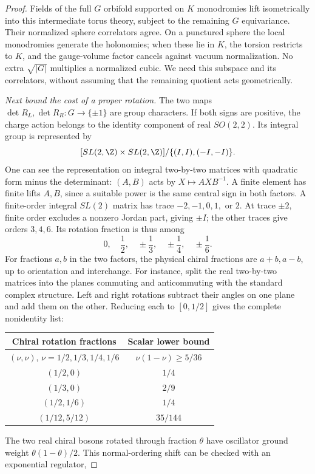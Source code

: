 \begin{proof}
Fields of the full $G$ orbifold supported on $K$ monodromies
lift isometrically into this intermediate torus theory, subject
to the remaining $G$ equivariance. Their normalized sphere
correlators agree. On a punctured sphere the local monodromies
generate the holonomies; when these lie in $K$, the torsion
restricts to $K$, and the gauge-volume factor cancels against
vacuum normalization. No extra $\sqrt{|G|}$ multiplies a
normalized cubic. We need this subspace and its correlators,
without assuming that the remaining quotient acts geometrically.

\emph{Next bound the cost of a proper rotation.}
The two maps $\det R_L,\det R_R:G\to\{\pm1\}$ are group
characters. If both signs are positive, the charge action belongs
to the identity component of real $SO(2,2)$. Its integral group
is represented by
\[
 [SL(2,\Z)\times SL(2,\Z)]/\{(I,I),(-I,-I)\}.
\]
One can see the representation on integral two-by-two matrices
with quadratic form minus the determinant: $(A,B)$ acts by
$X\mapsto AXB^{-1}$. A finite element has finite lifts $A,B$,
since a suitable power is the same central sign in both factors.
A finite-order integral $SL(2)$ matrix has trace
$-2,-1,0,1,$ or $2$. At trace $\pm2$, finite order excludes
a nonzero Jordan part, giving $\pm I$; the other traces give
orders $3,4,6$. Its rotation fraction is thus among
\[
 0,\quad\frac12,\quad\pm\frac13,\quad
 \pm\frac14,\quad\pm\frac16.
\]
For fractions $a,b$ in the two factors, the physical chiral
fractions are $a+b,a-b$, up to orientation and interchange.
For instance, split the real two-by-two matrices into the
planes commuting and anticommuting with the standard complex
structure. Left and right rotations subtract their angles on
one plane and add them on the other.
Reducing each to $[0,1/2]$ gives the complete nonidentity list:
\begin{center}
\begin{tabular}{c|c}
Chiral rotation fractions & Scalar lower bound\\\hline
$(\nu,\nu)$, $\nu=1/2,1/3,1/4,1/6$
 & $\nu(1-\nu)\geq5/36$\\
$(1/2,0)$ & $1/4$\\
$(1/3,0)$ & $2/9$\\
$(1/2,1/6)$ & $1/4$\\
$(1/12,5/12)$ & $35/144$
\end{tabular}
\end{center}
The two real chiral bosons rotated through fraction $\theta$
have oscillator ground weight $\theta(1-\theta)/2$. This
normal-ordering shift can be checked with an exponential regulator,

\end{proof}
